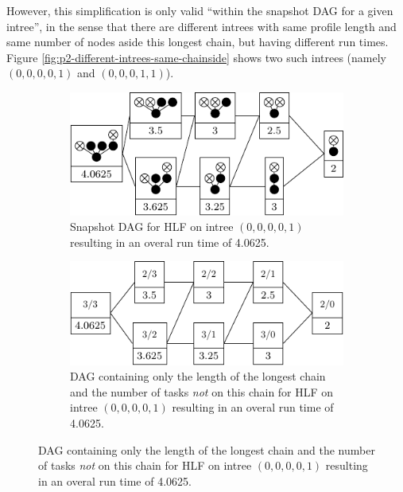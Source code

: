However, this simplification is only valid ``within the snapshot DAG for a given intree'', in the sense that there are different intrees with same profile length and same number of nodes aside this longest chain, but having different run times. Figure \ref{fig:p2-different-intrees-same-chainside} shows two such intrees (namely $(0,0,0,0,1)$ and $(0,0,0,1,1)$).

\begin{figure}[th]
  \centering
  \begin{subfigure}{.45\textwidth}
    \centering
    \includegraphics{p2/00001.pdf}
    \caption{Snapshot DAG for HLF on intree $(0,0,0,0,1)$ resulting in an overal run time of 4.0625.}
  \end{subfigure}
  \quad
  \begin{subfigure}{.45\textwidth}
    \centering
    \includegraphics{p2/00001_chain.pdf}
    \caption{DAG containing only the length of the longest chain and the number of tasks \emph{not} on this chain for HLF on intree $(0,0,0,0,1)$ resulting in an overal run time of 4.0625.}
  \end{subfigure}


\end{figure}
